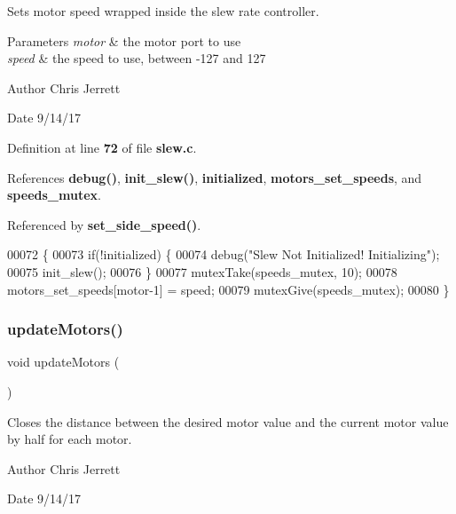 Sets motor speed wrapped inside the slew rate controller. 


\begin{DoxyParams}{Parameters}
{\em motor} & the motor port to use \\
\hline
{\em speed} & the speed to use, between -\/127 and 127 \\
\hline
\end{DoxyParams}
\begin{DoxyAuthor}{Author}
Chris Jerrett 
\end{DoxyAuthor}
\begin{DoxyDate}{Date}
9/14/17 
\end{DoxyDate}


Definition at line \textbf{ 72} of file \textbf{ slew.\+c}.



References \textbf{ debug()}, \textbf{ init\+\_\+slew()}, \textbf{ initialized}, \textbf{ motors\+\_\+set\+\_\+speeds}, and \textbf{ speeds\+\_\+mutex}.



Referenced by \textbf{ set\+\_\+side\+\_\+speed()}.


\begin{DoxyCode}
00072                                          \{
00073   \textcolor{keywordflow}{if}(!initialized) \{
00074     debug(\textcolor{stringliteral}{"Slew Not Initialized! Initializing"});
00075     init_slew();
00076   \}
00077   mutexTake(speeds_mutex, 10);
00078   motors_set_speeds[motor-1] = speed;
00079   mutexGive(speeds_mutex);
00080 \}
\end{DoxyCode}
\mbox{\label{slew_8c_a807a87c5df438fde21c1e8213906695b}} 
\subsubsection{update\+Motors()}
{\footnotesize\ttfamily void update\+Motors (\begin{DoxyParamCaption}{ }\end{DoxyParamCaption})}



Closes the distance between the desired motor value and the current motor value by half for each motor. 

\begin{DoxyAuthor}{Author}
Chris Jerrett 
\end{DoxyAuthor}
\begin{DoxyDate}{Date}
9/14/17 
\end{DoxyDate}


